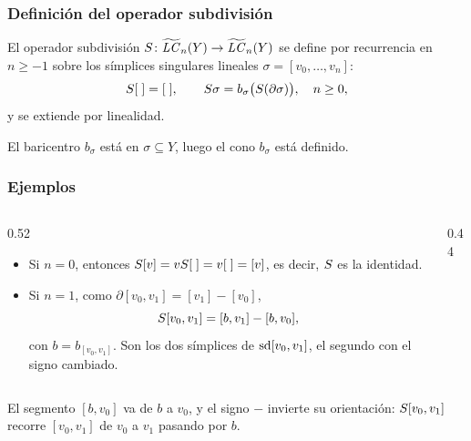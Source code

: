 \begin{frame}
  \frametitle{Definición del operador subdivisión}

  \begin{definition}
    El \alert{operador subdivisión}
    $S\colon\widetilde{\mathit{LC}}_n(Y)\to\widetilde{\mathit{LC}}_n(Y)$ se define por
    recurrencia en $n\geq-1$ sobre los símplices singulares lineales
    $\sigma=[v_0,\ldots,v_n]$:
    \[
      S[\;]=[\;],
      \qquad
      S\sigma=b_\sigma\bigl(S(\partial\sigma)\bigr),\quad n\geq0,
    \]
    y se extiende por linealidad.
  \end{definition}

  \medskip

  El baricentro $b_\sigma$ está en $\sigma\subseteq Y$, luego el cono
  $b_\sigma$ está definido.
\end{frame}

\begin{frame}
  \frametitle{Ejemplos}

  \begin{columns}[c]
    \begin{column}{0.52\textwidth}
      \begin{itemize}
        \item Si $n=0$, entonces $S[v]=vS[\;]=v[\;]=[v]$, es decir, $S$ es la identidad.
        \item Si $n=1$, como $\partial[v_0,v_1]=[v_1]-[v_0]$,
          \[
            S[v_0,v_1]=[b,v_1]-[b,v_0],
          \]
          con $b=b_{[v_0,v_1]}$. Son los dos símplices de $\operatorname{sd}[v_0,v_1]$,
          el segundo con el signo cambiado.
      \end{itemize}
    \end{column}
    \begin{column}{0.44\textwidth}
      \centering
    \end{column}
  \end{columns}

  \medskip

  El segmento $[b,v_0]$ va de $b$ a $v_0$, y el signo $-$ invierte su
  orientación: $S[v_0,v_1]$ recorre $[v_0,v_1]$ de $v_0$ a $v_1$ pasando por $b$.
\end{frame}


